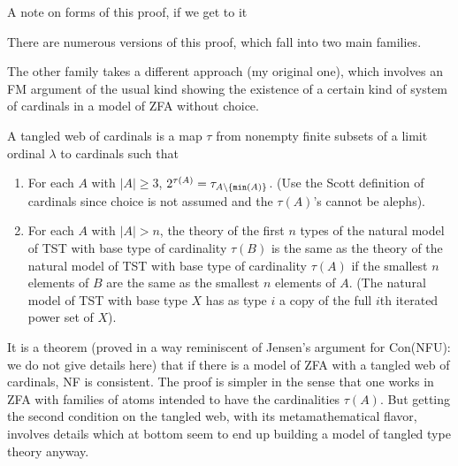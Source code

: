 \documentclass{slides}
\begin{document}
\begin{slide}

{\Large A note on forms of this proof, if we get to it}

There are numerous versions of this proof, which fall into two main families.

The other family takes a different approach (my original one), which involves an FM argument of the usual kind showing the existence of a certain kind of system of cardinals in a model of ZFA without choice.

A tangled web of cardinals is a map $\tau$ from nonempty finite subsets of a limit ordinal $\lambda$ to cardinals
such that 

\begin{enumerate}

\item For each $A$ with $|A| \geq 3$, $2^{\tau(A)} = \tau_{A \setminus \{{\tt min}(A)\}}$.  (Use the Scott definition of cardinals since choice is not assumed and the $\tau(A)$'s cannot be alephs).

\item For each $A$ with $|A|>n$, the theory of the first $n$ types of the natural model of TST with base type of cardinality $\tau(B)$  is the same as the theory of the natural model of TST with base type of cardinality $\tau(A)$ if the smallest $n$ elements of $B$ are the same as the smallest $n$ elements of $A$.  (The natural model of TST with base type $X$ has as type $i$ a copy of the full $i$th iterated power set of $X$).

\end{enumerate}

It is a theorem (proved in a way reminiscent of Jensen's argument for Con(NFU):  we do not give details here) that if there is a model of ZFA with a tangled web of cardinals, NF is consistent.  The proof is simpler in the sense that one works in ZFA with families of atoms intended to have the cardinalities $\tau(A)$.  But getting the second condition on the tangled web, with its metamathematical flavor, involves details which at bottom seem to end up building a model of tangled type theory anyway.


\end{slide}
\end{document}
